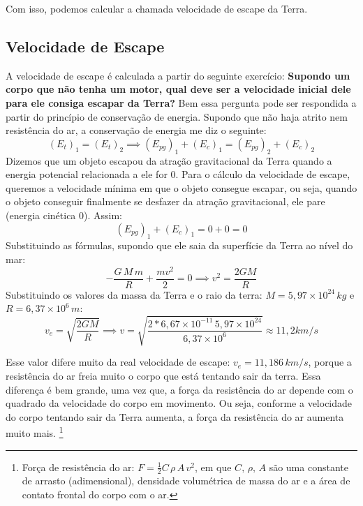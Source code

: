 \documentclass[12pt]{extarticle}
\newcommand{\<}{\langle}
\renewcommand{\>}{\rangle}
\theoremstyle{definition}
\begin{document}
Com isso, podemos calcular a chamada velocidade de escape da Terra.
\subsection{Velocidade de Escape}
A velocidade de escape é calculada a partir do seguinte exercício: \textbf{Supondo um corpo que não tenha um motor, qual deve ser a velocidade inicial dele para ele consiga escapar da Terra?}
Bem essa pergunta pode ser respondida a partir do princípio de conservação de energia. Supondo que não haja atrito nem resistência do ar, a conservação de energia me diz o seguinte:
\begin{equation}
    (E_t)_1=(E_t)_2 \implies (E_{pg})_1 + (E_c)_1 = (E_{pg})_2 + (E_c)_2
\end{equation}
Dizemos que um objeto escapou da atração gravitacional da Terra quando a energia potencial relacionada a ele for 0. Para o cálculo da velocidade de escape, queremos a velocidade mínima em que o objeto consegue escapar, ou seja, quando o objeto conseguir finalmente se desfazer da atração gravitacional, ele pare (energia cinética 0). Assim:
\begin{equation}
    (E_{pg})_1 + (E_c)_1 = 0+0=0
\end{equation}
Substituindo as fórmulas, supondo que ele saia da superfície da Terra ao nível do mar:
\begin{equation}
    -\frac{G\,M\,m}{R} + \frac{mv^2}{2}=0 \implies v^2 = \frac{2GM}{R}
\end{equation}
Substituindo os valores da massa da Terra e o raio da terra: $M=5,97\times10^{24}\,kg$ e $R=6,37\times10^6\,m$:
\begin{equation}
    v_e = \sqrt{\frac{2GM}{R}} \implies v =\sqrt{\frac{2*6,67\times10^{-11}\,5,97\times10^{24}}{6,37\times10^6}} \approx 11,2 km/s
\end{equation}

Esse valor difere muito da real velocidade de escape: $v_e= 11,186\,km/s$, porque a resistência do ar freia muito o corpo que está tentando sair da terra. Essa diferença é bem grande, uma vez que, a força da resistência do ar depende com o quadrado da velocidade do corpo em movimento. Ou seja, conforme a velocidade do corpo tentando sair da Terra aumenta, a força da resistência do ar aumenta muito mais. \footnote{Força de resistência do ar: $F = \frac{1}{2}C\,\rho\,A\,v^2$, em que $C,\,\rho,\,A$ são uma constante de arrasto (adimensional), densidade volumétrica de massa do ar e a área de contato frontal do corpo com o ar.}
\end{document}
